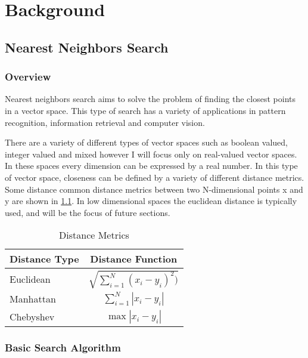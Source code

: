 \chapter{Background} %

\label{Background} %


\section{Nearest Neighbors Search}

\subsection{Overview}

Nearest neighbors search aims to solve the problem of finding the closest points in a vector space.  This type of search has a variety of applications in pattern recognition, information retrieval and computer vision.

There are a variety of different types of vector spaces such as boolean valued, integer valued and mixed however I will focus only on real-valued vector spaces.  In these spaces every dimension can be expressed by a real number.  In this type of vector space, closeness can be defined by a variety of different distance metrics.  Some distance common distance metrics between two N-dimensional points x and y are shown in \ref{table:distancemet}.  In low dimensional spaces the euclidean distance is typically used, and will be the focus of future sections.

\begin{table}
\begin{tabular}{ | l | c |}
	\hline
	Distance Type & Distance Function \\
	\hline
	Euclidean & $\sqrt{\sum\limits_{i=1}^N (x_i - y_i)^2)}$ \\
	\hline
	Manhattan & $\sum\limits_{i=1}^N |x_i - y_i|$ \\
	\hline
	Chebyshev & $\max{|x_i - y_i|}$ \\
	\hline
\end{tabular}
\caption{Distance Metrics}
\label{table:distancemet}
\end{table}

\subsection{Basic Search Algorithm}

